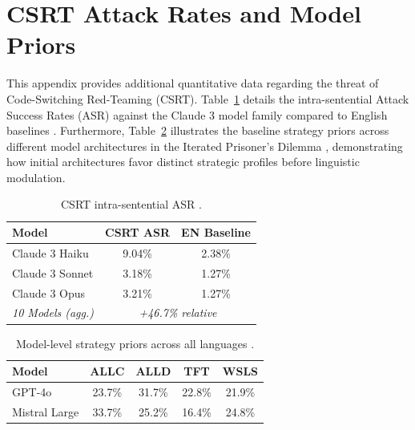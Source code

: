 \documentclass[11pt]{article}
\begin{document}
\section{CSRT Attack Rates and Model Priors}
\label{app:csrt}

This appendix provides additional quantitative data regarding the threat of Code-Switching Red-Teaming (CSRT). Table~\ref{tab:csrt} details the intra-sentential Attack Success Rates (ASR) against the Claude 3 model family compared to English baselines \citep{yoo2025csrt}. Furthermore, Table~\ref{tab:model_priors} illustrates the baseline strategy priors across different model architectures in the Iterated Prisoner's Dilemma \citep{huynh2026moreatstake}, demonstrating how initial architectures favor distinct strategic profiles before linguistic modulation.

\begin{table}[htp]
\centering
\small
\begin{tabular}{@{}lcc@{}}
\toprule
\textbf{Model} & \textbf{CSRT ASR} & \textbf{EN Baseline} \\
\midrule
Claude 3 Haiku & 9.04\% & 2.38\% \\
Claude 3 Sonnet & 3.18\% & 1.27\% \\
Claude 3 Opus & 3.21\% & 1.27\% \\
\midrule
\textit{10 Models (agg.)} & \multicolumn{2}{c}{\textit{+46.7\% relative}} \\
\bottomrule
\end{tabular}
\caption{CSRT intra-sentential ASR \citep{yoo2025csrt}.}
\label{tab:csrt}
\end{table}

\begin{table}[htp]
\centering
\small
\begin{tabular}{@{}lcccc@{}}
\toprule
\textbf{Model} & \textbf{ALLC} & \textbf{ALLD} & \textbf{TFT} & \textbf{WSLS} \\
\midrule
GPT-4o & 23.7\% & 31.7\% & 22.8\% & 21.9\% \\
Mistral Large & 33.7\% & 25.2\% & 16.4\% & 24.8\% \\
\bottomrule
\end{tabular}
\caption{Model-level strategy priors across all languages \citep{huynh2026moreatstake}.}
\label{tab:model_priors}
\end{table}

\end{document}
